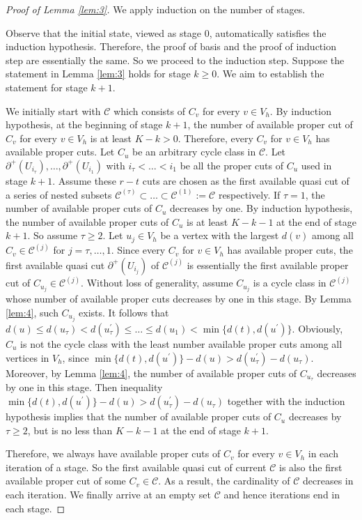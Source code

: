 \documentclass[11pt]{article}
\begin{document}
\begin{proof}[Proof of Lemma \ref{lem:3}]
We apply induction on the number of stages.

Observe that the initial state, viewed as stage 0, automatically satisfies the induction hypothesis. Therefore, the proof of basis and the proof of induction step are essentially the same. So we proceed to the induction step. Suppose the statement in Lemma \ref{lem:3} holds for stage $k\geq 0$. We aim to establish the statement for stage $k+1$.

We initially start with $\mathcal{C}$ which consists of $C_v$ for every $v\in V_h$. By induction hypothesis, at the beginning of stage $k+1$, the number of available proper cut of $C_v$ for every $v\in V_h$ is at least $K-k>0$. Therefore, every $C_v$ for $v\in V_h$ has available proper cuts. Let $C_u$ be an arbitrary cycle class in $\mathcal{C}$. Let $\partial^+(U_{i_\tau}),\dots,\partial^+(U_{i_1})$ with $i_\tau<\dots<i_1$ be all the proper cuts of $C_u$ used in stage $k+1$. Assume these $r-t$ cuts are chosen as the first available quasi cut of a series of nested subsets $\mathcal{C}^{(\tau)}\subset\dots\subset\mathcal{C}^{(1)}:=\mathcal{C}$ respectively. If $\tau=1$, the number of available proper cuts of $C_u$ decreases by one. By induction hypothesis, the number of available proper cuts of $C_u$ is at least $K-k-1$ at the end of stage $k+1$. So assume $\tau\geq 2$. Let $u_j\in V_h$ be a vertex with the largest $d(v)$ among all $C_v\in \mathcal{C}^{(j)}$ for $j=\tau,\dots,1$. Since every $C_v$ for $v\in V_h$ has available proper cuts, the first available quasi cut $\partial^+(U_{i_j})$ of $\mathcal{C}^{(j)}$ is essentially the first available proper cut of $C_{u_j}\in \mathcal{C}^{(j)}$. Without loss of generality, assume $C_{u_j}$ is a cycle class in $\mathcal{C}^{(j)}$ whose number of available proper cuts decreases by one in this stage. By Lemma \ref{lem:4}, such $C_{u_j}$ exists. It follows that $d(u)\leq d(u_\tau)< d(u^\prime_\tau)\leq\dots\leq d(u_1)< \min\{d(t),d(u^\prime)\}$. Obviously, $C_u$ is not the cycle class with the least number available proper cuts among all vertices in $V_h$, since $\min\{d(t),d(u^\prime)\}-d(u)> d(u_\tau^\prime)-d(u_\tau)$. Moreover, by Lemma \ref{lem:4}, the number of available proper cuts of $C_{u_\tau}$ decreases by one in this stage. Then inequality $\min\{d(t),d(u^\prime)\}-d(u)>d(u_\tau^\prime)-d(u_\tau)$ together with the induction hypothesis implies that the number of available proper cuts of $C_u$ decreases by $\tau\geq 2$, but is no less than $K-k-1$ at the end of stage $k+1$.

Therefore, we always have available proper cuts of $C_v$ for every $v\in V_h$ in each iteration of a stage. So the first available quasi cut of current $\mathcal{C}$ is also the first available proper cut of some $C_v\in \mathcal{C}$. As a result, the cardinality of $\mathcal{C}$ decreases in each iteration. We finally arrive at an empty set $\mathcal{C}$ and hence iterations end in each stage.
\end{proof}
\end{document}
